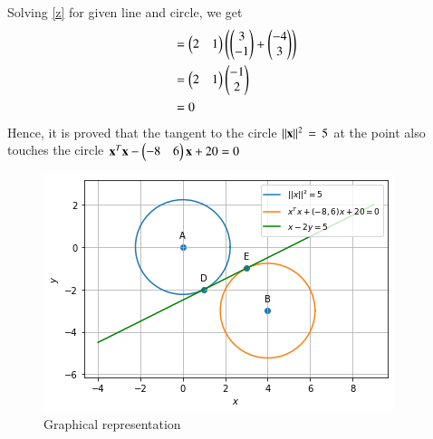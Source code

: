 \documentclass[journal,12pt,twocolumn]{IEEEtran}
\begin{document}
Solving \eqref{z} for given line and circle, we get
\begin{align}
&= \begin{pmatrix}2 & 1\end{pmatrix}\left(\begin{pmatrix}3 \\ -1\end{pmatrix}+\begin{pmatrix}-4 \\ 3\end{pmatrix}\right) \\
&= \begin{pmatrix}2 & 1\end{pmatrix}\begin{pmatrix}-1 \\ 2\end{pmatrix}\\
&= 0
\end{align}
Hence, it is proved that the tangent to the circle $\lVert\mathbf{x}\rVert^2\,=\,5$ at the point  also touches the circle $  \mathbf{x}^T\mathbf{x}-\begin{pmatrix}-8 & 6\end{pmatrix}\mathbf{x}+20 = 0$
\begin{figure}[htp]
    \centering
    \includegraphics[width = \columnwidth]{a_3.png}
    \caption{Graphical representation}
\end{figure}
\end{document}
